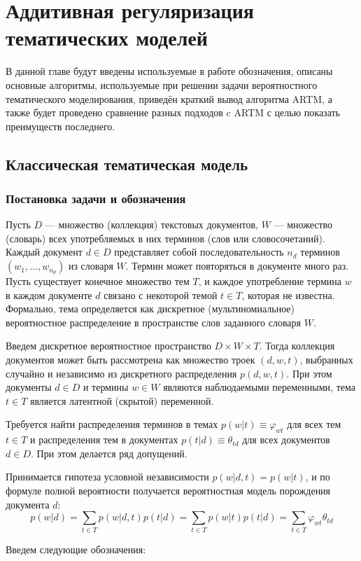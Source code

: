 \documentclass[12pt]{article}
\renewcommand{\phi}{\varphi}
\begin{document}
	\section{Аддитивная регуляризация тематических моделей}
В данной главе будут введены используемые в работе обозначения, описаны основные алгоритмы, используемые при решении задачи вероятностного тематического моделирования, приведён краткий вывод алгоритма ARTM, а также будет проведено сравнение разных подходов c ARTM с целью показать преимуществ последнего.
	\subsection{Классическая тематическая модель}
\subsubsection{Постановка задачи и обозначения}
\label{subsec:denotes}
Пусть $D$ --- множество (коллекция) текстовых документов, $W$ --- множество (словарь) всех употребляемых в них терминов (слов или словосочетаний). Каждый документ $d \in D$ представляет собой последовательность $n_d$ терминов $(w_1, . . . , w_{n_d})$ из словаря $W$. Термин может повторяться в документе много раз. Пусть существует конечное множество тем $T$, и каждое употребление термина $w$ в каждом документе $d$ связано с некоторой темой $t \in T$, которая не известна. Формально, тема определяется как дискретное (мультиномиальное) вероятностное распределение в пространстве слов заданного словаря $W$.

Введем дискретное вероятностное пространство $D \times W \times T$. Тогда коллекция документов может быть рассмотрена как множество троек $(d, w, t)$, выбранных случайно и независимо из дискретного распределения $p(d, w, t)$. При этом документы $d \in D$ и термины $w \in W$ являются наблюдаемыми переменными, тема $t \in T$ является латентной (скрытой) переменной.

Требуется найти распределения терминов в темах $p(w|t) \equiv \phi_{wt}$ для всех тем $t \in T$ и распределения тем в документах $p(t|d) \equiv \theta_{td}$ для всех документов $d \in D$. При этом делается ряд допущений.

Принимается гипотеза условной независимости $p(w|d,t) = p(w|t)$, и  по формуле полной вероятности получается вероятностная модель порождения документа $d$:
\[
p(w|d) = \sum_{t \in T} p(w|d,t)p(t|d) = \sum_{t \in T}p(w|t)p(t|d)=\sum_{t \in T}\phi_{wt}\theta_{td}
\]

Введем следующие обозначения:
\end{document}
